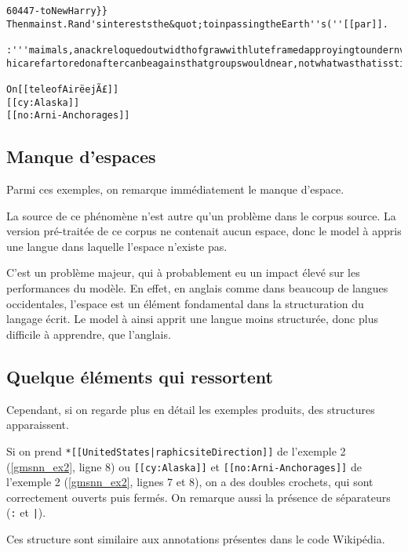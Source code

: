 \begin{lstlisting}[caption={Exemple 3~: des termes balisé comme dans l'exemple 2, et une autre suite de carractères.},label=gmsnn_ex3]
60447-toNewHarry}}
Thenmainst.Rand'sintereststhe&quot;toinpassingtheEarth''s(''[[par]].

:'''maimals,anackreloquedoutwidthofgrawwithluteframedapproyingtoundernverby[[hebesination]]of&lt;/smalkan,instablishedacondorttodevelopedframesbeforestatedwinkingaroundinrational hicarefartoredonaftercanbeagainsthatgroupswouldnear,notwhatwasthatisstillastructionCenter,toDagnythat

On[[teleofAirëejÃ£]]
[[cy:Alaska]]
[[no:Arni-Anchorages]]
\end{lstlisting}

\subsection{Manque d'espaces}\label{whitespace_problem}
Parmi ces exemples, on remarque immédiatement le manque d'espace.

La source de ce phénomène n'est autre qu'un problème dans le corpus source.
La version pré-traitée de ce corpus ne contenait aucun espace, donc le \gls{model} à appris une langue dans laquelle l'espace n'existe pas.

C'est un problème majeur, qui à probablement eu un impact élevé sur les performances du modèle. En effet, en anglais comme dans beaucoup de langues occidentales, l'espace est un élément fondamental dans la structuration du langage écrit. Le \gls{model} à ainsi apprit une langue moins structurée, donc plus difficile à apprendre, que l'anglais.

\subsection{Quelque éléments qui ressortent}
Cependant, si on regarde plus en détail les exemples produits, des structures apparaissent. 

Si on prend \lstinline!*[[UnitedStates|raphicsiteDirection]]! de l'exemple 2 (\autoref{gmsnn_ex2}, ligne 8) ou 
\lstinline![[cy:Alaska]]! et \lstinline![[no:Arni-Anchorages]]! de l'exemple 2 (\autoref{gmsnn_ex2}, lignes 7 et 8), on a des doubles crochets, qui sont correctement ouverts puis fermés. On remarque aussi la présence de séparateurs (\lstinline!:! et \lstinline!|!).

Ces structure sont similaire aux annotations présentes dans le code Wikipédia.

